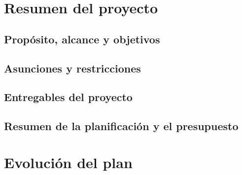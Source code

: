 \section{Resumen del proyecto}

\subsection{Propósito, alcance y objetivos}

\subsection{Asunciones y restricciones}

\subsection{Entregables del proyecto}

\subsection{Resumen de la planificación y el presupuesto}

\section{Evolución del plan}
